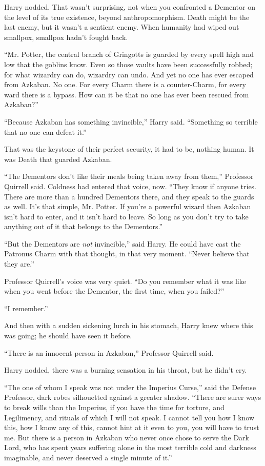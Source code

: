 Harry nodded. That wasn't surprising, not when you confronted a Dementor on the level of its true existence, beyond anthropomorphism. Death might be the last enemy, but it wasn't a sentient enemy. When humanity had wiped out smallpox, smallpox hadn't fought back.

``Mr. Potter, the central branch of Gringotts is guarded by every spell high and low that the goblins know. Even so those vaults have been successfully robbed; for what wizardry can do, wizardry can undo. And yet no one has ever escaped from Azkaban. No one. For every Charm there is a counter-Charm, for every ward there is a bypass. How can it be that no one has ever been rescued from Azkaban?''

``Because Azkaban has something invincible,'' Harry said. ``Something so terrible that no one can defeat it.''

That was the keystone of their perfect security, it had to be, nothing human. It was Death that guarded Azkaban.

``The Dementors don't like their meals being taken away from them,'' Professor Quirrell said. Coldness had entered that voice, now. ``They know if anyone tries. There are more than a hundred Dementors there, and they speak to the guards as well. It's that simple, Mr. Potter. If you're a powerful wizard then Azkaban isn't hard to enter, and it isn't hard to leave. So long as you don't try to take anything out of it that belongs to the Dementors.''

``But the Dementors are \emph{not} invincible,'' said Harry. He could have cast the Patronus Charm with that thought, in that very moment. ``Never believe that they are.''

Professor Quirrell's voice was very quiet. ``Do you remember what it was like when you went before the Dementor, the first time, when you failed?''

``I remember.''

And then with a sudden sickening lurch in his stomach, Harry knew where this was going; he should have seen it before.

``There is an innocent person in Azkaban,'' Professor Quirrell said.

Harry nodded, there was a burning sensation in his throat, but he didn't cry.

``The one of whom I speak was not under the Imperius Curse,'' said the Defense Professor, dark robes silhouetted against a greater shadow. ``There are surer ways to break wills than the Imperius, if you have the time for torture, and Legilimency, and rituals of which I will not speak. I cannot tell you how I know this, how I know any of this, cannot hint at it even to you, you will have to trust me. But there is a person in Azkaban who never once chose to serve the Dark Lord, who has spent years suffering alone in the most terrible cold and darkness imaginable, and never deserved a single minute of it.''

